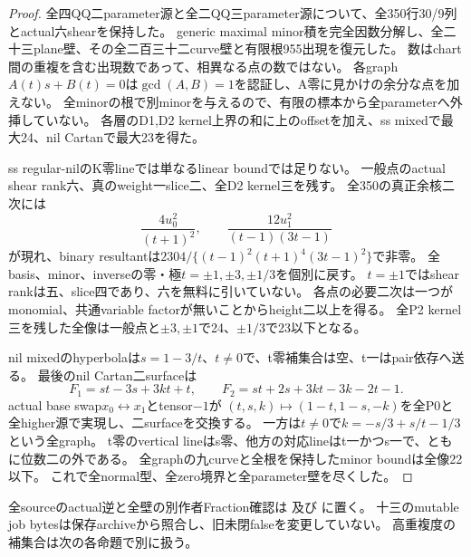 \documentclass[a4paper,11pt]{ltjsarticle}
\theoremstyle{definition}
\begin{document}
\begin{proof}
全四QQ二parameter源と全二QQ三parameter源について、全350行30/9列とactual六shearを保持した。
generic maximal minor積を完全因数分解し、全二十三plane壁、その全二百三十二curve壁と有限根955出現を復元した。
数はchart間の重複を含む出現数であって、相異なる点の数ではない。
各graph $A(t)s+B(t)=0$は$\gcd(A,B)=1$を認証し、A零に見かけの余分な点を加えない。
全minorの根で別minorを与えるので、有限の標本から全parameterへ外挿していない。
各層のD1,D2 kernel上界の和に上のoffsetを加え、ss mixedで最大24、nil Cartanで最大23を得た。

ss regular-nilのK零lineでは単なるlinear boundでは足りない。
一般点のactual shear rank六、真のweight一slice二、全D2 kernel三を残す。
全350の真正余核二次には
\[
 \frac{4u_0^2}{(t+1)^2},\qquad
 \frac{12u_1^2}{(t-1)(3t-1)}
\]
が現れ、binary resultantは$2304/\{(t-1)^2(t+1)^4(3t-1)^2\}$で非零。
全basis、minor、inverseの零・極$t=\pm1,\pm3,\pm1/3$を個別に戻す。
$t=\pm1$ではshear rankは五、slice四であり、六を無料に引いていない。
各点の必要二次は一つがmonomial、共通variable factorが無いことからheight二以上を得る。
全P2 kernel三を残した全像は一般点と$\pm3,\pm1$で24、$\pm1/3$で23以下となる。

nil mixedのhyperbolaは$s=1-3/t$、$t\ne0$で、t零補集合は空、t一はpair依存へ送る。
最後のnil Cartan二surfaceは
\[
 F_1=st-3s+3kt+t,
 \qquad F_2=st+2s+3kt-3k-2t-1.
\]
actual base swap$x_0\leftrightarrow x_1$とtensor$-1$が
$(t,s,k)\mapsto(1-t,1-s,-k)$を全P0と全higher源で実現し、二surfaceを交換する。
一方は$t\ne0$で$k=-s/3+s/t-1/3$という全graph。
t零のvertical lineはs零、他方の対応lineはt一かつs一で、ともに位数二の外である。
全graphの九curveと全根を保持したminor boundは全像22以下。
これで全normal型、全zero境界と全parameter壁を尽くした。
\end{proof}
全sourceのactual逆と全壁の別作者Fraction確認は
及び
に置く。
十三のmutable job bytesは保存archiveから照合し、旧未閉falseを変更していない。
高重複度の補集合は次の各命題で別に扱う。
\end{document}

